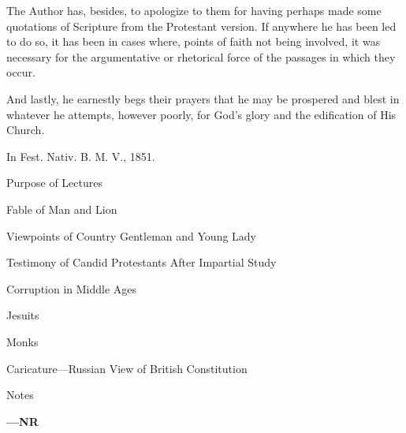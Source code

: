 The Author has,
besides, to apologize to them for having perhaps made
some quotations of Scripture from the Protestant version.
If anywhere he has been led to do so, it has been in
cases where, points of faith not being involved, it was
necessary for the argumentative or rhetorical force of
the passages in which they occur.


And lastly, he earnestly begs their prayers that he
may be prospered and blest in whatever he attempts,
however poorly, for God's glory and the edification of
His Church.


In Fest. Nativ. B. M. V., 1851.


Purpose
of Lectures

Fable
of Man and Lion

Viewpoints
of Country Gentleman and Young Lady

Testimony
of Candid Protestants After Impartial Study

Corruption in Middle Ages

Jesuits

Monks

Caricature—Russian View of British Constitution

Notes

\textbf{—NR}

